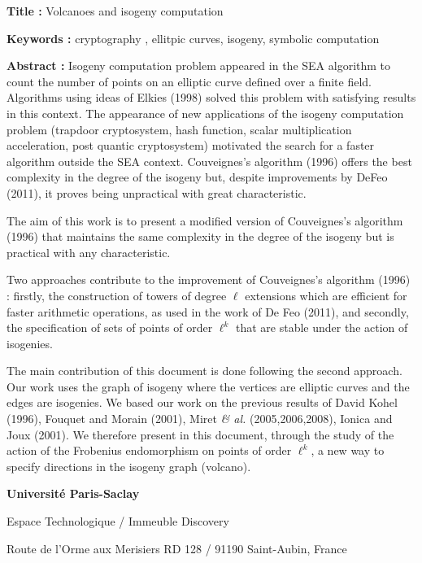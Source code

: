 \documentclass[a4paper, titlepage, 11pt]{book}
\newcommand{\titreeng}{Volcanoes and isogeny computation}
\begin{document}
\begin{breakbox}

\noindent\textbf{Title : }\titreeng

\vspace{2ex}

\noindent\textbf{Keywords : }cryptography , ellitpic curves, isogeny, 
symbolic computation

\begin{multicols}{2}
\noindent\textbf{Abstract : }
Isogeny computation problem appeared in the SEA algorithm to count the number of points on an elliptic curve defined over a finite field. Algorithms using ideas of Elkies (1998) solved this problem with satisfying results in this context. The appearance of new applications of the isogeny computation problem (trapdoor cryptosystem, hash function, scalar multiplication acceleration, post quantic cryptosystem) motivated the search for a faster algorithm outside the SEA context. Couveignes's algorithm (1996) offers the best complexity in the degree of the isogeny but, despite improvements by DeFeo (2011), it proves being unpractical with great characteristic.

The aim of this work is to present a modified version of Couveignes's 
algorithm (1996) that maintains the same complexity in the degree of the 
isogeny but is practical with any characteristic.

Two approaches contribute to the improvement of Couveignes's algorithm
(1996) : firstly, the construction of towers of degree $\ell$ extensions which 
are efficient for faster arithmetic operations, as used in the work of De Feo 
(2011), and secondly, the specification of sets of points of order $\ell^k$ 
that are stable under the action of isogenies.

The main contribution of this document is done following the second approach. 
Our work uses the graph of isogeny where the vertices are 
elliptic curves and the edges are isogenies. We based our work on the previous 
results of David Kohel (1996), Fouquet and Morain (2001), Miret \emph{\& al.}
(2005,2006,2008), Ionica and Joux (2001). We therefore present in this 
document, through the study of the action of the Frobenius endomorphism on 
points of order $\ell^k$, a new way to specify directions in the isogeny graph (volcano). 

\end{multicols}
\end{breakbox}


{\tiny
\noindent
\textbf{Université Paris-Saclay}

\noindent
Espace Technologique / Immeuble Discovery

\noindent
Route de l’Orme aux Merisiers RD 128 / 91190 Saint-Aubin, France 

}
\end{document}
